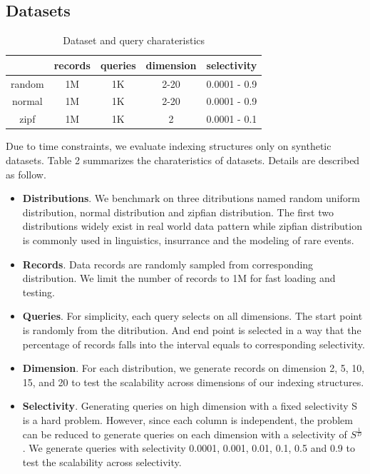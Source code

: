 \documentclass[sigconf,10pt]{acmart}
\begin{document}
\subsection{Datasets}

\begin{table}[h]
  \centering
  \begin{tabular}{|c|c|c|c|c|}
    \hline
          & records & queries & dimension & selectivity \\
    \hline
    random & 1M & 1K & 2-20 & 0.0001 - 0.9 \\
    \hline
    normal & 1M & 1K & 2-20 & 0.0001 - 0.9 \\
    \hline
    zipf & 1M & 1K & 2 & 0.0001 - 0.1 \\
    \hline 
  \end{tabular}
  \caption{Dataset and query charateristics}
  \label{table:dataset}
\end{table}

Due to time constraints, we evaluate indexing structures only on synthetic datasets.
Table 2 summarizes the charateristics of datasets. Details are described as follow.
\begin{itemize}
  \item \textbf{Distributions}. We benchmark on three ditributions named random uniform
  distribution, normal distribution and zipfian distribution. The first two distributions
  widely exist in real world data pattern while zipfian distribution is commonly used in
  linguistics, insurrance and the modeling of rare events.
  \item \textbf{Records}. Data records are randomly sampled from corresponding distribution.
  We limit the number of records to 1M for fast loading and testing.
  \item \textbf{Queries}. For simplicity, each query selects on all dimensions. The start
  point is randomly from the ditribution. And end point is selected in a way that the
  percentage of records falls into the interval equals to corresponding selectivity.
  \item \textbf{Dimension}. For each distribution, we generate records on dimension 2, 5, 10, 15,
  and 20 to test the scalability across dimensions of our indexing structures.
  \item \textbf{Selectivity}. Generating queries on high dimension with a fixed selectivity S is
  a hard problem. However, since each column is independent, the problem can be reduced to generate
  queries on each dimension with a selectivity of $S^{\frac{1}{D}}$. We generate queries with
  selectivity 0.0001, 0.001, 0.01, 0.1, 0.5 and 0.9 to test the scalability across selectivity.
\end{itemize}
\end{document}
